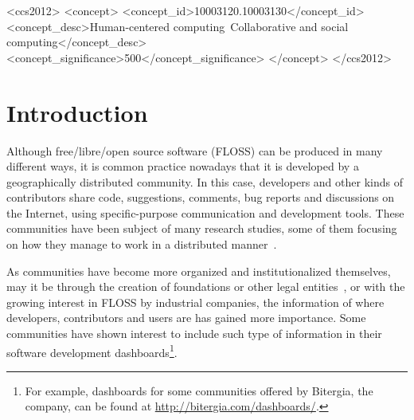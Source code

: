 \documentclass{sig-alternate-05-2015}
\begin{document}
%
%

\begin{CCSXML}
<ccs2012>
<concept>
<concept_id>10003120.10003130</concept_id>
<concept_desc>Human-centered computing~Collaborative and social computing</concept_desc>
<concept_significance>500</concept_significance>
</concept>
</ccs2012>
\end{CCSXML}


%
%

%
%
\printccsdesc




\section{Introduction}
\label{sec:intro}

Although free/libre/open source software (FLOSS) can be produced in many different ways, it is common practice nowadays that it is developed by a geographically distributed community. In this case, developers and other kinds of contributors share code, suggestions, comments, bug reports and discussions on the Internet, using specific-purpose communication and development tools. These communities have been subject of many research studies, some of them focusing on how they manage to work in a distributed manner~\cite{german2003gnome,yu2016effect}.

As communities have become more organized and institutionalized themselves, may it be through the creation of foundations or other legal entities~\cite{riehle2010economic}, or with the growing interest in FLOSS by industrial companies, the information of where developers, contributors and users are has gained more importance. Some communities have shown interest to include such type of information in their software development dashboards\footnote{For example, dashboards for some communities offered by Bitergia, the company, can be found at \url{http://bitergia.com/dashboards/}.}.
\end{document}
